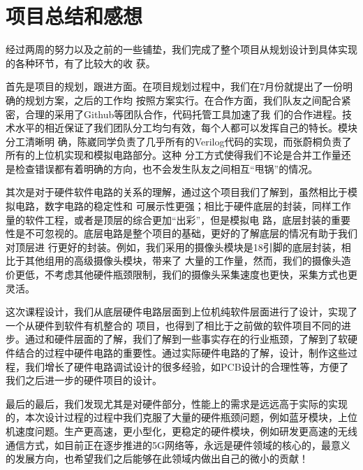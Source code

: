 \documentclass[a4paper]{paper}
\begin{document}
\section{项目总结和感想}
经过两周的努力以及之前的一些铺垫，我们完成了整个项目从规划设计到具体实现的各种环节，有了比较大的收
获。

首先是项目的规划，跟进方面。在项目规划过程中，我们在7月份就提出了一份明确的规划方案，之后的工作均
按照方案实行。在合作方面，我们队友之间配合紧密，合理的采用了Github等团队合作，代码托管工具加速了我
们的合作进程。技术水平的相近保证了我们团队分工均匀有效，每个人都可以发挥自己的特长。模块分工清晰明
确，陈崴同学负责了几乎所有的Verilog代码的实现，而张蔚桐负责了所有的上位机实现和模拟电路部分。这种
分工方式使得我们不论是合并工作量还是检查错误都有着明确的方向，也不会发生队友之间相互“甩锅”的情况。

其次是对于硬件软件电路的关系的理解，通过这个项目我们了解到，虽然相比于模拟电路，数字电路的稳定性和
可展示性更强；相比于硬件底层的封装，同样工作量的软件工程，或者是顶层的综合更加“出彩”，但是模拟电
路，底层封装的重要性是不可忽视的。底层电路是整个项目的基础，更好的了解底层的情况有助于我们对顶层进
行更好的封装。例如，我们采用的摄像头模块是18引脚的底层封装，相比于其他组用的高级摄像头模块，带来了
大量的工作量，然而，我们的摄像头造价更低，不考虑其他硬件瓶颈限制，我们的摄像头采集速度也更快，采集方式也更灵活。

这次课程设计，我们从底层硬件电路层面到上位机纯软件层面进行了设计，实现了一个从硬件到软件有机整合的
项目，也得到了相比于之前做的软件项目不同的进步。通过和硬件层面的了解，我们了解到一些事实存在的行业瓶颈，了解到了软硬件结合的过程中硬件电路的重要性。通过实际硬件电路的了解，设计，制作这些过程，我们增长了硬件电路调试设计的很多经验，如PCB设计的合理性等，方便了我们之后进一步的硬件项目的设计。

最后的最后，我们发现尤其是对硬件部分，性能上的需求是远远高于实际的实现的，本次设计过程的过程中我们克服了大量的硬件瓶颈问题，例如蓝牙模块，上位机速度问题。生产更高速，更小型化，更稳定的硬件模块，例如研发更高速的无线通信方式，如目前正在逐步推进的5G网络等，永远是硬件领域的核心的，最意义的发展方向，也希望我们之后能够在此领域内做出自己的微小的贡献！
\end{document}
